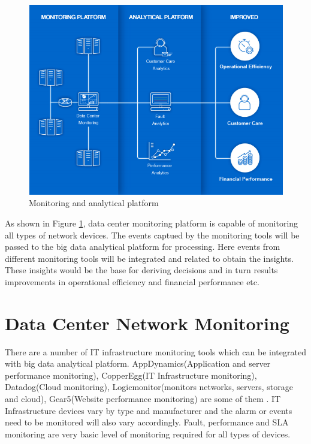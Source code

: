 \documentclass[sigconf]{acmart}
\begin{document}
\begin{figure}[htb]
  \centering
  \includegraphics[width=1.0\textwidth]{images/Figure1.png}
  \caption{Monitoring and analytical platform 
  \cite{datacenter-monitoring-and-analytics-platform}}
  \label{fig:Figure1} 
\end{figure}

As shown in Figure \ref{fig:Figure1}, data center monitoring platform is capable of monitoring all types of network devices. The events captued by the monitoring tools will be passed to the big data analytical platform for processing. Here events from different monitoring tools will be integrated and related to obtain the insights. These insights would be the base for deriving decisions and in turn results improvements in operational efficiency and financial performance etc.

\section{Data Center Network Monitoring}

There are a number of IT infrastructure monitoring tools which can be integrated with big data analytical platform. AppDynamics(Application and server performance monitoring), CopperEgg(IT Infrastructure monitoring), Datadog(Cloud monitoring), Logicmonitor(monitors networks, servers, storage and cloud), Gear5(Website performance monitoring) are some of them \cite{top-server-monitoring-application-performance-monitoring-apm-solutions}. IT Infrastructure devices vary by type and manufacturer and the alarm or events need to be monitored will also vary accordingly. Fault, performance and SLA monitoring are very basic level of monitoring required for all types of devices.
\end{document}
